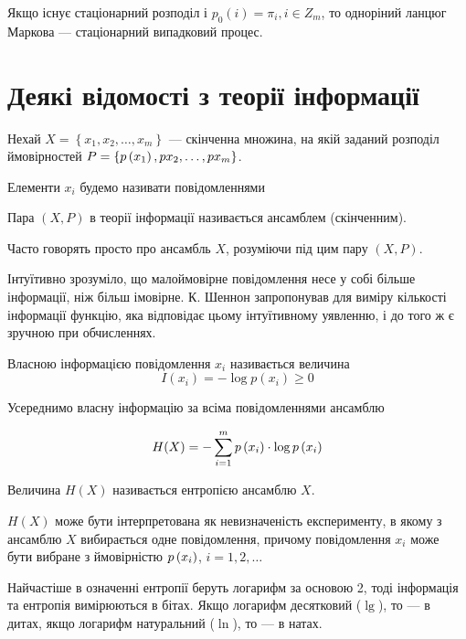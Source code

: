 Якщо існує стаціонарний розподіл  і $p_0\left( i \right) = \pi_i, i \in Z_m$,
то одноріний ланцюг Маркова --- стаціонарний випадковий процес.

\section{Деякі відомості з теорії інформації}

Нехай  $X=\left\{ x_1, x_2, \dots, x_m \right\}$ ---
скінченна множина, на якій заданий розподіл ймовірностей 
$P = \left\{ p\left(x_1\right), p{x_2}, \dots, p{x_m} \right\}$.

\begin{definition}[Повідомлення]
    Елементи  $x_i$ будемо називати повідомленнями
\end{definition}

\begin{definition}
    Пара $\left( X, P \right)$ в теорії інформації
    називається ансамблем (скінченним).
\end{definition}

Часто говорять просто про ансамбль $X$, розуміючи під цим пару
$\left( X, P \right)$.

Інтуїтивно зрозуміло, що малоймовірне повідомлення несе у собі  більше
інформації, ніж більш імовірне. К. Шеннон запропонував для виміру кількості
інформації функцію, яка відповідає цьому інтуїтивному уявленню, і до того ж  є
зручною при обчисленнях.

\begin{definition}
    Власною інформацією повідомлення $x_i$ називається величина
    $$I\left(x_i\right)=-\log{p\left( x_i \right)} \ge 0$$
\end{definition}

Усереднимо власну інформацію за всіма повідомленнями ансамблю

$$H(X)=-\sum_{i=1}^m p\left(x_i\right) \cdot \log{p\left(x_i\right)}$$

\begin{definition}
Величина  $H\left( X \right)$ називається ентропією ансамблю $X$.
\end{definition}

$H\left( X \right)$ може бути інтерпретована як невизначеність експерименту,
в  якому  з ансамблю $X$ вибирається одне повідомлення, причому
повідомлення $x_i$ може бути вибране з ймовірністю $p\left(x_i\right)$, $i=1,2,\dots$

Найчастіше в означенні ентропії
беруть логарифм за основою 2, тоді інформація та ентропія вимірюються в бітах.
Якщо логарифм десятковий ($\lg$), то --- в дитах,
якщо логарифм натуральний ($\ln$), то --- в натах.
